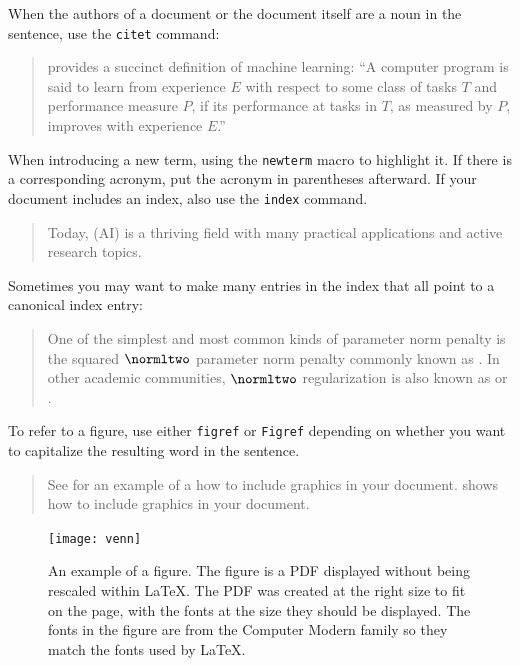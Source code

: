 When the authors of a document or the document itself are a noun in the
sentence, use the {\tt citet} command:

\begin{quote}
\citet{Mitchell:1997:ML} provides a succinct definition of machine learning:
``A computer program is said to learn from experience $E$ with respect to some
class of tasks $T$ and performance measure $P$, if its performance at tasks in
$T$, as measured by $P$, improves with experience $E$.''
\end{quote}

When introducing a new term, using the {\tt newterm} macro to highlight it.
If there is a corresponding acronym, put the acronym in parentheses
afterward. If your document includes an index, also use the {\tt index}
command.

\begin{quote}
Today,  (AI) is
a thriving field with many practical applications and active research topics.
\end{quote}

Sometimes you may want to make many entries in the index that all point
to a canonical index entry:

\begin{quote}
One of the simplest
and most common kinds of parameter norm penalty is
the squared $\normltwo$ parameter norm penalty
commonly known as .
In other academic communities,
$\normltwo$ regularization is also known as 
or .
\end{quote}

To refer to a figure, use either {\tt figref} or {\tt Figref} depending on
whether you want to capitalize the resulting word in the sentence.

\begin{quote}
See  for an example of a how to include graphics
in your document.
 shows how to include graphics in your document.
\end{quote}


\begin{figure}[t!]
\centering
\texttt{[image: venn]}
\caption{An example of a figure.
The figure is a PDF displayed without being rescaled within {\LaTeX}.
The PDF was created at the right size to fit on the page, with the
fonts at the size they should be displayed. The fonts in the figure
are from the Computer Modern family so they match the fonts used
by \LaTeX.}
\label{fig:venn}
\end{figure}

